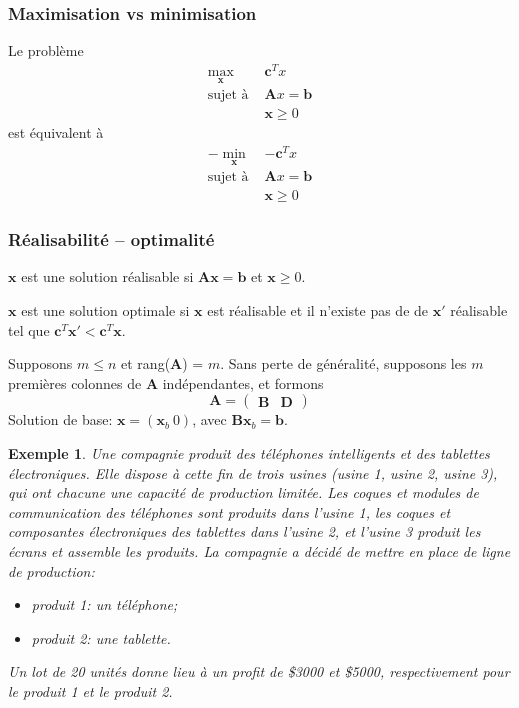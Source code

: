 \documentclass[usepdftitle=false]{beamer}
\def\bb{\boldsymbol{b}}
\def\bc{\boldsymbol{c}}
\def\bx{\boldsymbol{x}}
\def\bA{\boldsymbol{A}}
\def\bB{\boldsymbol{B}}
\def\bD{\boldsymbol{D}}
\newtheorem{exe}{Exemple}
\begin{document}
\begin{frame}
\frametitle{Maximisation vs minimisation}

Le problème
\begin{align*}
\max_{\bx} \ & \bc^T x \\
\mbox{sujet à } & \bA x = \bb \\
& \bx \geq 0
\end{align*}
est équivalent à
\begin{align*}
- \min_{\bx} \ & -\bc^T x \\
\mbox{sujet à } &  \bA x = \bb \\
& \bx \geq 0
\end{align*}

\end{frame}

\begin{frame}
\frametitle{Réalisabilité -- optimalité}

$\bx$ est une solution réalisable si $\bA\bx = \bb$ et $\bx \geq 0$.

\mbox{}

$\bx$ est une solution optimale si $\bx$ est réalisable et il n'existe pas de de $\bx'$ réalisable tel que $\bc^T \bx' < \bc^T \bx$.

\mbox{}

Supposons $m \leq n$ et rang($\bA$) = $m$.
Sans perte de généralité, supposons les $m$ premières colonnes de $\bA$ indépendantes, et formons
\[
\bA =
\begin{pmatrix}
 \bB & \bD
\end{pmatrix}
\]
Solution de base: $\bx = (\bx_b \ 0)$, avec $\bB\bx_b = \bb$.

\end{frame}

\begin{frame}
\begin{exe}
Une compagnie produit des téléphones intelligents et des tablettes électroniques.
Elle dispose à cette fin de trois usines (usine 1, usine 2, usine 3), qui ont chacune une capacité de production limitée.
Les coques et modules de communication des téléphones sont produits dans l'usine 1, les coques et composantes électroniques des tablettes dans l'usine 2, et l'usine 3 produit les écrans et assemble les produits.
La compagnie a décidé de mettre en place de ligne de production:
\begin{itemize}
\item
produit 1: un téléphone;
\item
produit 2: une tablette.
\end{itemize}

Un lot de 20 unités donne lieu à un profit de \$3000 et \$5000, respectivement pour le produit 1 et le produit 2.
\end{exe}

\end{frame}
\end{document}
